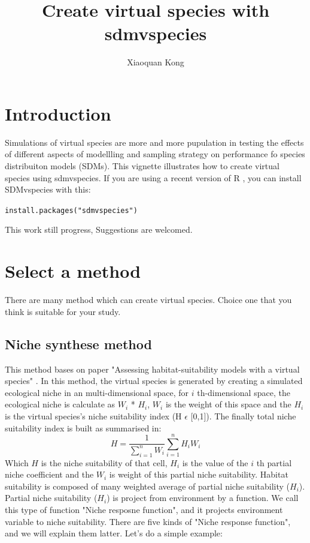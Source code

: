 \documentclass{report}
\newcommand{\R}{{\normalfont\textsf{R }}{}}
\begin{document}



\title{Create virtual species with sdmvspecies}
\author{Xiaoquan Kong}
\maketitle

\chapter{Introduction}
Simulations of virtual species are more and more pupulation in testing the effects of different aspects of modellling and sampling strategy on performance fo species distribuiton models (SDMs).
This vignette illustrates how to create virtual species using sdmvspecies.
If you are using a recent version of \R, you can install SDMvspecies with this:

\texttt{install.packages("sdmvspecies")}

This work still progress, Suggestions are welcomed.

\chapter{Select a method}
There are many method which can create virtual species. Choice one that you think is suitable for your study.
\section*{Niche synthese method}
This method bases on paper "Assessing habitat-suitability models with a virtual species" \citep{hirzel_assessing_2001}.
In this method, the virtual species is generated by creating a simulated ecological niche in an multi-dimensional space,
for $i$ th-dimensional space, the ecological niche is calculate as $W_i$ * $H_i$, $W_i$ is the weight of this space and the $H_i$ is the virtual species's niche
suitability index (H $\epsilon$ [0,1]). The finally total niche suitability index is built as summarised in:
\[
H = \frac{1}{\sum_{i=1}^n W_i} \sum_{i=1}^n H_i W_i
\]
Which $H$ is the niche suitability of that cell, $H_i$ is the value of the $i$ th partial niche coefficient and the $W_i$ is weight of this partial niche suitability.
Habitat suitability is composed of many weighted average of partial niche suitability ($H_i$). Partial niche suitability ($H_i$) is project from environment by a function. We call this type of function "Niche resposne function", and it projects environment variable to niche suitability.
There are five kinds of "Niche response function", and we will explain them latter.
Let's do a simple example:
\end{document}
